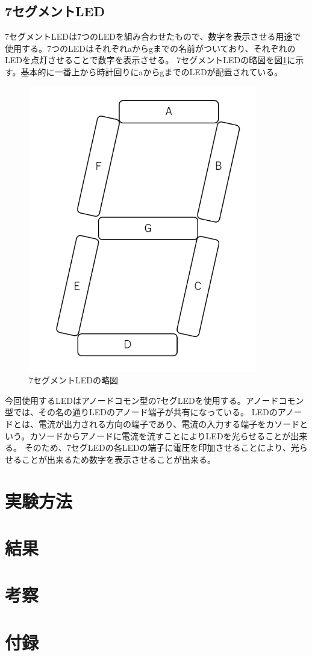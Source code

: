 \documentclass[a4paper,11pt]{jsarticle}
\begin{document}
\subsection{7セグメントLED}
7セグメントLEDは7つのLEDを組み合わせたもので、数字を表示させる用途で使用する。7つのLEDはそれぞれaからgまでの名前がついており、それぞれのLEDを点灯させることで数字を表示させる。
7セグメントLEDの略図を図\ref{fig:7seg}に示す。基本的に一番上から時計回りにaからgまでのLEDが配置されている。
\begin{figure}[h]
  \centering
  \includegraphics[width=10cm]{./images/7seg.png}
  \caption{7セグメントLEDの略図}
  \label{fig:7seg}
\end{figure}
今回使用するLEDはアノードコモン型の7セグLEDを使用する。アノードコモン型では、その名の通りLEDのアノード端子が共有になっている。
LEDのアノードとは、電流が出力される方向の端子であり、電流の入力する端子をカソードという。カソードからアノードに電流を流すことによりLEDを光らせることが出来る。
そのため、7セグLEDの各LEDの端子に電圧を印加させることにより、光らせることが出来るため数字を表示させることが出来る。
\section{実験方法}

\section{結果}

\section{考察}

\section{付録}
\end{document}
